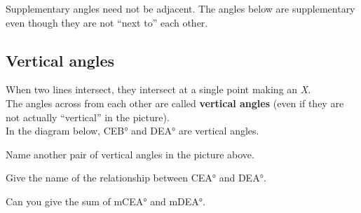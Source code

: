 \newpage

Supplementary angles need not be adjacent. 
The angles below are supplementary even though they are not ``next to'' each other.\\
	\begin{center}
	\end{center}
	
	\medskip
	
\subsection{Vertical angles}

When two lines intersect, they intersect at a single point making an \emph{X}.\\

The angles across from each other are called \textbf{vertical angles} 
(even if they are not actually ``vertical'' in the picture).\\

In the diagram below, \ang{CEB} and \ang{DEA} are vertical angles.

	\begin{center}
	\end{center}
	
\noindent \q Name another pair of vertical angles in the picture above. 
\vspace{1.0cm}

\noindent \q Give the name of the relationship between \ang{CEA} and \ang{DEA}. 
\vspace{1.0cm}

\noindent \q Can you give the sum of m\ang{CEA} and m\ang{DEA}. 
\medskip

